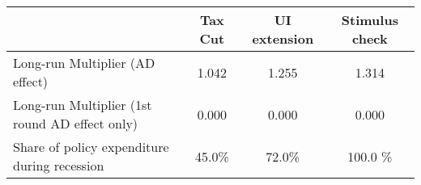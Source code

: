 \begin{tabular}{@{}lccc@{}} 
\toprule 
& Tax Cut    & UI extension    & Stimulus check    \\  \midrule 
Long-run Multiplier (AD effect) &1.042  & 1.255  & 1.314     \\ 
Long-run Multiplier (1st round AD effect only) &0.000  & 0.000  & 0.000     \\ 
Share of policy expenditure during recession &45.0\%  & 72.0\%  & 100.0 \%    \\ 
\end{tabular}  

